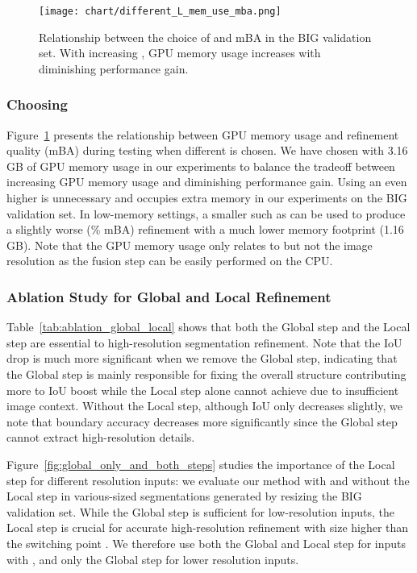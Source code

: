 \documentclass[10pt,twocolumn,letterpaper]{article}
\begin{document}
\begin{figure}[h]
\centering
	\texttt{[image: chart/different\_L\_mem\_use\_mba.png]}
	\caption{Relationship between the choice of  and mBA in the BIG validation set. With increasing , GPU memory usage increases with diminishing performance gain. }
	\label{fig:mem_iou}
	\vspace{-0.15in}
\end{figure}

\subsubsection{Choosing } 
Figure~\ref{fig:mem_iou} presents the relationship between GPU memory usage and refinement quality (mBA) during testing when different  is chosen. We have chosen  with 3.16 GB of GPU memory usage in our experiments to balance the tradeoff between increasing GPU memory usage and diminishing performance gain.
Using an even higher  is unnecessary and occupies extra memory in our experiments on the BIG validation set. 
In low-memory settings, a smaller  such as  can be used to produce a slightly worse (\% mBA) refinement with a much lower memory footprint (1.16 GB). Note that the GPU memory usage only relates to  but not the image resolution as the fusion step can be easily performed on the CPU.

\subsubsection{Ablation Study for Global and Local Refinement}
Table~\ref{tab:ablation_global_local} shows that both the Global step and the Local step are essential to high-resolution segmentation refinement. 
Note that the IoU drop is much more significant when we remove the Global step, indicating that the Global step is mainly responsible for fixing the overall structure contributing more to IoU boost while the Local step alone cannot achieve due to insufficient image context. Without the Local step, although IoU only decreases slightly, we note that boundary accuracy decreases more significantly since the Global step cannot extract high-resolution details.

Figure~\ref{fig:global_only_and_both_steps} studies the importance of the Local step for different resolution inputs: we evaluate our method with and without the Local step in various-sized segmentations generated by resizing the BIG validation set.
While the Global step is sufficient for low-resolution inputs, the Local step is crucial for accurate high-resolution refinement with size higher than the switching point .
We therefore use both the Global and Local step for inputs with , and only the Global step for lower resolution inputs.
\end{document}
